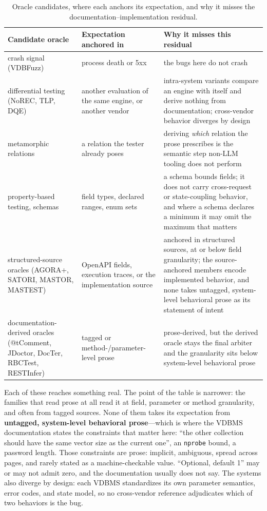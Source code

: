 \documentclass[acmsmall,screen,review,anonymous]{acmart}
\begin{document}
\begin{table}[t]
\caption{Oracle candidates, where each anchors its expectation, and why it misses the
documentation--implementation residual.}
\label{tab:oracles}
\footnotesize
\begin{tabular}{@{}p{}p{}p{}@{}}
\toprule
Candidate oracle & Expectation anchored in & Why it misses this residual \\
\midrule
crash signal (VDBFuzz) & process death or 5xx & the bugs here do not crash \\
differential testing (NoREC, TLP, DQE) & another evaluation of the same engine, or another vendor &
intra-system variants compare an engine with itself and derive nothing from documentation;
cross-vendor behavior diverges by design \\
metamorphic relations & a relation the tester already poses & deriving \emph{which} relation the
prose prescribes is the semantic step non-LLM tooling does not perform \\
property-based testing, schemas & field types, declared ranges, enum sets & a schema bounds fields;
it does not carry cross-request or state-coupling behavior, and where a schema declares a minimum it
may omit the maximum that matters \\
structured-source oracles (AGORA+, SATORI, MASTOR, MASTEST) & OpenAPI fields, execution traces, or
the implementation source & anchored in structured sources, at or below field granularity; the
source-anchored members encode implemented behavior, and none takes untagged, system-level
behavioral prose as its statement of intent \\
documentation-derived oracles (@tComment, JDoctor, DocTer, RBCTest, RESTInfer) & tagged or
method-/parameter-level prose & prose-derived, but the derived oracle stays the final arbiter and
the granularity sits below system-level behavioral prose \\
\bottomrule
\end{tabular}
\end{table}

Each of these reaches something real. The point of the table is narrower: the families that read
prose at all read it at field, parameter or method granularity, and often from tagged sources. None of
them takes its expectation from \textbf{untagged, system-level behavioral prose}---which is where the
VDBMS documentation states the constraints that matter here: ``the other collection should have the
same vector size as the current one'', an \texttt{nprobe} bound, a password length. Those
constraints are prose: implicit, ambiguous, spread across pages, and rarely stated as a
machine-checkable value. ``Optional, default 1'' may or may not admit zero, and the documentation
usually does not say. The systems also diverge by design: each VDBMS standardizes its own parameter
semantics, error codes, and state model, so no cross-vendor reference adjudicates which of two
behaviors is the bug.
\end{document}
